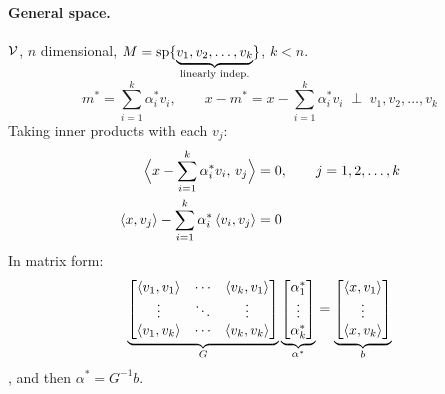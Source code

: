 \paragraph{General space.}
$\mathcal{V}$, $n$ dimensional, \quad $M = \operatorname{sp}\{\underbrace{v_1,v_2,\dots,v_k}_{\text{linearly indep.}}\}$, \quad $k<n$.
\[
m^* = \sum_{i=1}^k \alpha_i^* v_i,
\qquad
x-m^* = x-\sum_{i=1}^k \alpha_i^* v_i \;\perp\; v_1, v_2, \dots, v_k
\]
Taking inner products with each $v_j$:
\begin{align*}
\Big\langle x-\sum_{i=1}^k \alpha_i^* v_i,\, v_j\Big\rangle &= 0, \qquad j=1,2,\dots,k\\
\left\langle x, v_j \right\rangle - \sum_{i=1}^k \alpha_i^*\left\langle v_i, v_j \right\rangle &= 0
\end{align*}
In matrix form:
\begin{gather*}
\underbrace{\begin{bmatrix}\left\langle v_1, v_1 \right\rangle & \cdots & \left\langle v_k, v_1 \right\rangle\\ \vdots & \ddots & \vdots\\ \left\langle v_1, v_k \right\rangle & \cdots & \left\langle v_k, v_k \right\rangle\end{bmatrix}}_{G}
\underbrace{\begin{bmatrix}\alpha_1^*\\ \vdots\\ \alpha_k^*\end{bmatrix}}_{\alpha^*}
= \underbrace{\begin{bmatrix}\left\langle x, v_1 \right\rangle\\ \vdots\\ \left\langle x, v_k \right\rangle\end{bmatrix}}_{b}
\end{gather*}
, and then $\alpha^* = G^{-1}b$.

